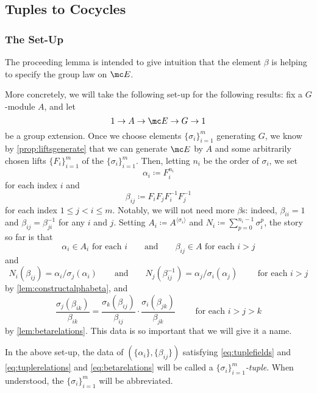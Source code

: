 \documentclass{article}
\numberwithin{equation}{section}
\begin{document}
\subsection{Tuples to Cocycles}
\subsubsection{The Set-Up}
The proceeding lemma is intended to give intuition that the element $\beta$ is helping to specify the group law on $\mc E$.

More concretely, we will take the following set-up for the following results: fix a $ G$-module $A$, and let
\[1\to A\to\mc E\to G\to1\]
be a group extension. Once we choose elements $\{\sigma_i\}_{i=1}^m$ generating $ G$, we know by \autoref{prop:liftsgenerate} that we can generate $\mc E$ by $A$ and some arbitrarily chosen lifts $\{F_i\}_{i=1}^m$ of the $\{\sigma_i\}_{i=1}^m$. Then, letting $n_i$ be the order of $\sigma_i$, we set
\[\alpha_i\coloneqq F_i^{n_i}\]
for each index $i$ and
\[\beta_{ij}\coloneqq F_iF_jF_i^{-1}F_j^{-1}\]
for each index $1\le j<i\le m$. Notably, we will not need more $\beta$s: indeed, $\beta_{ii}=1$ and $\beta_{ij}=\beta_{ji}^{-1}$ for any $i$ and $j$. Setting $A_i\coloneqq A^{\langle\sigma_i\rangle}$ and $N_i\coloneqq\sum_{p=0}^{n_i-1}\sigma_i^p$, the story so far is that
\begin{equation}
	\alpha_i\in A_i\text{ for each }i\qquad\text{and}\qquad\beta_{ij}\in A\text{ for each }i>j \label{eq:tuplefields}
\end{equation}
and
\begin{equation}
	N_i(\beta_{ij})=\alpha_i/\sigma_j(\alpha_i)\qquad\text{and}\qquad N_j(\beta_{ij}^{-1})=\alpha_j/\sigma_i(\alpha_j)\qquad\text{ for each }i>j \label{eq:tuplerelations}
\end{equation}
by \autoref{lem:constructalphabeta}, and
\begin{equation}
	\frac{\sigma_j(\beta_{ik})}{\beta_{ik}}=\frac{\sigma_k(\beta_{ij})}{\beta_{ij}}\cdot\frac{\sigma_i(\beta_{jk})}{\beta_{jk}}\qquad\text{ for each }i>j>k \label{eq:betarelations}
\end{equation}
by \autoref{lem:betarelations}. This data is so important that we will give it a name.
\begin{definition}
	In the above set-up, the data of $(\{\alpha_i\},\{\beta_{ij}\})$ satisfying \autoref{eq:tuplefields} and \autoref{eq:tuplerelations} and \autoref{eq:betarelations} will be called a \textit{$\{\sigma_i\}_{i=1}^m$-tuple}. When understood, the $\{\sigma_i\}_{i=1}^m$ will be abbreviated.
\end{definition}
\end{document}
